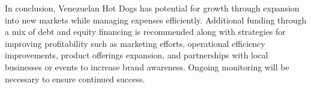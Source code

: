 In conclusion, Venezuelan Hot Dogs has potential for growth through expansion into new markets while managing expenses efficiently. Additional funding through a mix of debt and equity financing is recommended along with strategies for improving profitability such as marketing efforts, operational efficiency improvements, product offerings expansion, and partnerships with local businesses or events to increase brand awareness. Ongoing monitoring will be necessary to ensure continued success.